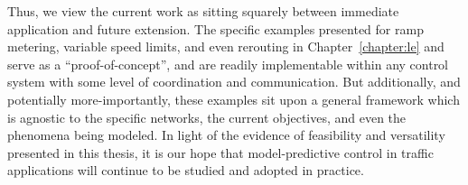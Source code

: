 Thus, we view the current work as sitting squarely between immediate application and future extension. The specific examples presented for ramp metering, variable speed limits, and even rerouting in Chapter~\ref{chapter:le} and~\cite{Samaranayake2014} serve as a ``proof-of-concept'', and are readily implementable within any control system with some level of coordination and communication. But additionally, and potentially more-importantly, these examples sit upon a general framework which is agnostic to the specific networks, the current objectives, and even the phenomena being modeled. In light of the evidence of feasibility and versatility presented in this thesis, it is our hope that model-predictive control in traffic applications will continue to be studied and adopted in practice.